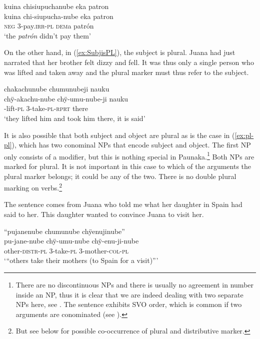 \ea\label{ex:3sg-3pl-2}
\begingl 
\glpreamble kuina chisiupuchanube eka patron\\
\gla kuina chi-siupucha-nube eka patron\\ 
\glb \textsc{neg} 3-pay.\textsc{irr}-\textsc{pl} \textsc{dem}a patrón\\ 
\glft ‘the \textit{patrón} didn’t pay them’\\ 
\endgl
\trailingcitation{[mxx-p110825l.042]}
\xe

On the other hand, in (\ref{ex:SubjisPL}), the subject is plural. Juana had just narrated that her brother felt dizzy and fell. It was thus only a single person who was lifted and taken away and the plural marker must thus refer to the subject. %

\ea\label{ex:SubjisPL}
\begingl
\glpreamble chakachunube chumunubeji nauku\\
\gla chÿ-akachu-nube chÿ-umu-nube-ji nauku\\
-lift-\textsc{pl} 3-take-\textsc{pl}-\textsc{rprt} there\\
\glft ‘they lifted him and took him there, it is said’
\endgl
\trailingcitation{[jxx-p120430l-2.444]}
\xe

It is also possible that both subject and object are plural as is the case in (\ref{ex:pl-pl}), which has two conominal NPs that encode subject and object. The first NP only consists of a modifier, but this is nothing special in Paunaka.\footnote{There are no discontinuous NPs and there is usually no agreement in number inside an NP, thus it is clear that we are indeed dealing with two separate NPs here, see . The sentence exhibits SVO order, which is common if two arguments are conominated (see ).}  Both NPs are marked for plural. It is not important in this case to which of the arguments the plural marker belongs; it could be any of the two. There is no double plural marking on verbs.\footnote{But see below for possible co-occurrence of plural and distributive marker.}

The sentence comes from Juana who told me what her daughter in Spain had said to her. This daughter wanted to convince Juana to visit her.

\ea\label{ex:pl-pl}
\begingl 
\glpreamble “pujanenube chumunube chÿenujinube”\\
\gla pu-jane-nube chÿ-umu-nube chÿ-enu-ji-nube\\ 
\glb other-\textsc{distr}-\textsc{pl} 3-take-\textsc{pl} 3-mother-\textsc{col}-\textsc{pl}\\ 
\glft ‘“others take their mothers (to Spain for a visit)”’\\ 
\endgl
\trailingcitation{[jxx-e120516l-1.030]}
\xe
{}


